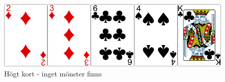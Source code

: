 \begin{figure}[H]
 \begin{minipage}[c]{0.5\textwidth}
  \includegraphics[width=\textwidth]{../img/w05-hands/none.png}
 \end{minipage}
 \begin{minipage}[c]{0.3\textwidth}
  \caption{Högt kort - inget mönster finns}
 \label{lab:shuffle:last-picture}
  \end{minipage}
\end{figure}
